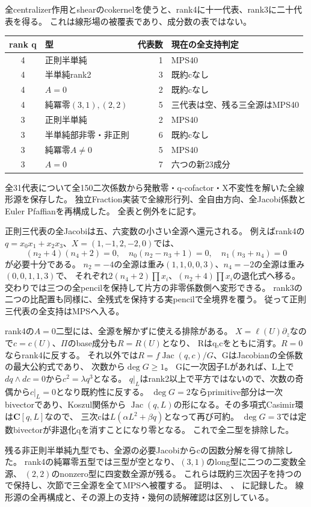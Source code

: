 \documentclass[a4paper,11pt]{ltjsarticle}
\theoremstyle{definition}
\newcommand{\CC}{\mathbf C}
\begin{document}
全centralizer作用とshearのcokernelを使うと、rank4に十一代表、rank3に二十代表を得る。
これは線形場の被覆表であり、成分数の表ではない。
\begin{center}\small
\begin{tabular}{c|l|r|l}
rank q&型&代表数&現在の全支持判定\\\hline
4&正則半単純&1&MPS40\\
4&半単純rank2&3&既約cなし\\
4&$A=0$&2&既約cなし\\
4&純冪零$(3,1),(2,2)$&5&三代表は空、残る三全源はMPS40\\
3&正則半単純&2&MPS40\\
3&半単純部非零・非正則&6&既約cなし\\
3&純冪零$A\ne0$&5&MPS40\\
3&$A=0$&7&六つの新23成分
\end{tabular}
\end{center}
全31代表について全150二次係数から発散零・q-cofactor・X不変性を解いた全線形源を保存した。
独立Fraction実装で全線形行列、全自由方向、全Jacobi係数とEuler Pfaffianを再構成した。
全表と例外をに記す。

正則三代表の全Jacobiは五、六変数の小さい全源へ還元される。
例えばrank4の$q=x_0x_1+x_2x_3$、$X=(1,-1,2,-2,0)$では、
\[
 (n_2+4)(n_4+2)=0,\quad
 n_0(n_2-n_3+1)=0,\quad n_1(n_3+n_4)=0
\]
が必要十分である。
$n_2=-4$の全源は重み$(1,1,0,0,3)$、$n_4=-2$の全源は重み$(0,0,1,1,3)$で、
それぞれ$2(n_4+2)\prod x_i$、$(n_2+4)\prod x_i$の退化式へ移る。
交わりでは三つの全pencilを保持して片方の非零係数側へ変形できる。
rank3の二つの比配置も同様に、全残式を保持する実pencilで全境界を覆う。
従って正則三代表の全支持はMPSへ入る。

rank4の$A=0$二型には、全源を解かずに使える排除がある。
$X=\ell(U)\partial_z$なので$c=c(U)$、$\Pi$のbase成分も$R=R(U)$となり、
Rはq,cをともに消す。$R=0$ならrank4に反する。
それ以外では$R=f\operatorname{Jac}(q,c)/G$、GはJacobianの全係数の最大公約式であり、
次数から$\deg G\ge1$。
Gに一次因子Lがあれば、L上で$dq\wedge dc=0$から$c^2=\lambda q^3$となる。
$q|_L$はrank2以上で平方ではないので、次数の奇偶から$c|_L=0$となり既約性に反する。
$\deg G=2$ならprimitive部分は一次bivectorであり、Koszul関係から
$\operatorname{Jac}(q,L)$の形になる。その多項式Casimir環は$\CC[q,L]$なので、
三次cは$L(\alpha L^2+\beta q)$となって再び可約。
$\deg G=3$では定数bivectorが非退化qを消すことになり零となる。
これで全二型を排除した。

残る非正則半単純九型でも、全源の必要Jacobiからcの因数分解を得て排除した。
rank4の純冪零五型では三型が空となり、$(3,1)$のlong型に二つの二変数全源、
$(2,2)$のnonzero型に四変数全源が残る。
これらは既約三次因子を持つので保持し、次節で三全源を全てMPSへ被覆する。
証明は、
、
に記録した。
線形源の全再構成と、その源上の支持・幾何の読解確認は区別している。
\end{document}
